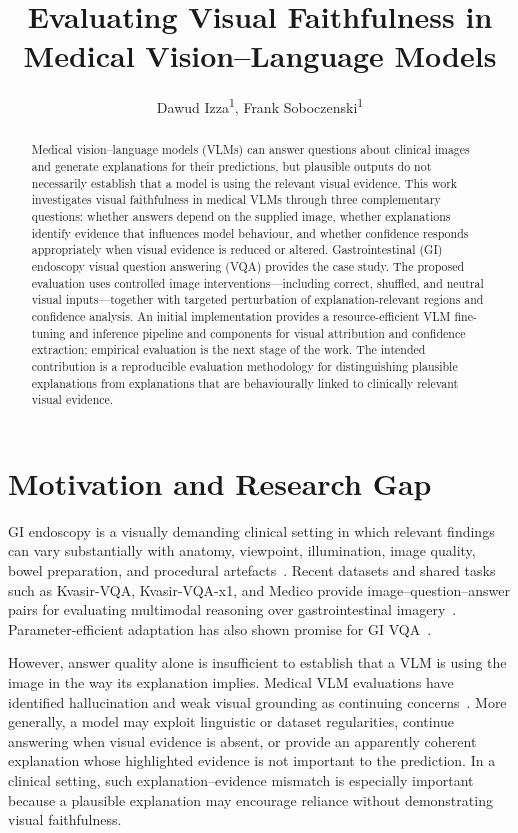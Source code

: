 \documentclass[letterpaper]{article}
\title{Evaluating Visual Faithfulness in Medical Vision--Language Models}
\author{
    Dawud Izza\textsuperscript{\rm 1},
    Frank Soboczenski\textsuperscript{\rm 1}
}
\begin{document}
\maketitle

\begin{abstract}
Medical vision--language models (VLMs) can answer questions about clinical images and generate explanations for their predictions, but plausible outputs do not necessarily establish that a model is using the relevant visual evidence. This work investigates visual faithfulness in medical VLMs through three complementary questions: whether answers depend on the supplied image, whether explanations identify evidence that influences model behaviour, and whether confidence responds appropriately when visual evidence is reduced or altered. Gastrointestinal (GI) endoscopy visual question answering (VQA) provides the case study. The proposed evaluation uses controlled image interventions---including correct, shuffled, and neutral visual inputs---together with targeted perturbation of explanation-relevant regions and confidence analysis. An initial implementation provides a resource-efficient VLM fine-tuning and inference pipeline and components for visual attribution and confidence extraction; empirical evaluation is the next stage of the work. The intended contribution is a reproducible evaluation methodology for distinguishing plausible explanations from explanations that are behaviourally linked to clinically relevant visual evidence.
\end{abstract}

\section{Motivation and Research Gap}

GI endoscopy is a visually demanding clinical setting in which relevant findings can vary substantially with anatomy, viewpoint, illumination, image quality, bowel preparation, and procedural artefacts~\cite{beg2017quality}. Recent datasets and shared tasks such as Kvasir-VQA, Kvasir-VQA-x1, and Medico provide image--question--answer pairs for evaluating multimodal reasoning over gastrointestinal imagery~\cite{gautam2024kvasirvqa,gautam2025kvasirvqa,gautam2025medico}. Parameter-efficient adaptation has also shown promise for GI VQA~\cite{peter2026parameterefficient}.

However, answer quality alone is insufficient to establish that a VLM is using the image in the way its explanation implies. Medical VLM evaluations have identified hallucination and weak visual grounding as continuing concerns~\cite{chang2025medheval,liu2026medical}. More generally, a model may exploit linguistic or dataset regularities, continue answering when visual evidence is absent, or provide an apparently coherent explanation whose highlighted evidence is not important to the prediction. In a clinical setting, such explanation--evidence mismatch is especially important because a plausible explanation may encourage reliance without demonstrating visual faithfulness.
\end{document}
